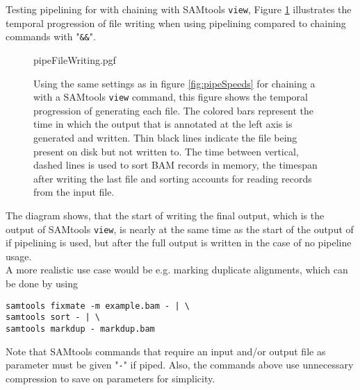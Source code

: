 Testing pipelining for \sort with chaining \sort with SAMtools \texttt{view},  
Figure \ref{fig:pipeWrite} illustrates the temporal progression of file writing when using pipelining compared to chaining commands with "\texttt{\&\&}".
\begin{figure}[t]
        {pipeFileWriting.pgf}
    \caption{Using the same settings as in figure \ref{fig:pipeSpeeds} for chaining a \sort with a SAMtools \texttt{view} command, this figure shows the temporal progression of generating each file. The colored bars represent the time in which the output that is annotated at the left axis is generated and written. Thin black lines indicate the file being present on disk but not written to. The time between vertical, dashed lines is used to sort BAM records in memory, the timespan after writing the last file and sorting accounts for reading records from the input file. }
    \label{fig:pipeWrite}
\end{figure}
The diagram shows, that the start of writing the final output, which is the output of SAMtools \texttt{view}, is nearly at the same time as the start of the output of \sort if pipelining is used, but after the full output is written in the case of no pipeline usage. \\
A more realistic use case would be e.g. marking duplicate alignments, which can be done by using 
\begin{verbatim} 
samtools fixmate -m example.bam - | \
samtools sort - | \ 
samtools markdup - markdup.bam
\end{verbatim}
Note that SAMtools commands that require an input and/or output file as parameter must be given "\texttt{-}" if piped. Also, the commands above use unnecessary compression to save on parameters for simplicity. \\

